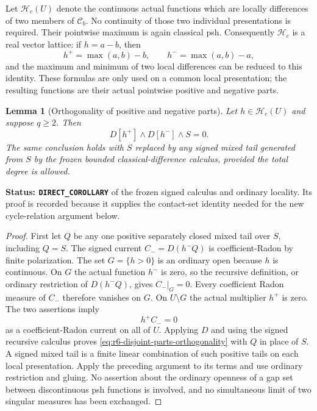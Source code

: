 \documentclass[11pt,a4paper]{article}
\numberwithin{equation}{section}
\newtheorem{lemma}[theorem]{Lemma}
\theoremstyle{definition}
\theoremstyle{remark}
\begin{document}
Let $\mathscr H_c(U)$ denote the continuous actual functions
which are locally differences of two members of
$\mathcal C_b$. No continuity of those two individual
presentations is required. Their pointwise maximum is again
classical psh. Consequently $\mathscr H_c$ is a real vector
lattice: if $h=a-b$, then
\[
 h^+=\max(a,b)-b,\qquad h^-=\max(a,b)-a,
\]
and the maximum and minimum of two local differences can
be reduced to this identity. These formulas are only used
on a common local presentation; the resulting functions
are their actual pointwise positive and negative parts.

\begin{lemma}[Orthogonality of positive and negative parts]
\label{lem:r6-disjoint-parts-orthogonality}
Let $h\in\mathscr H_c(U)$ and suppose $q\geq2$. Then
\begin{equation}
       D[h^+]\wedge D[h^-]\wedge S=0.
 \label{eq:r6-disjoint-parts-orthogonality}
\end{equation}
The same conclusion holds with $S$ replaced by any signed
mixed tail generated from $S$ by the frozen bounded
classical-difference calculus, provided the total degree
is allowed.
\end{lemma}

\noindent\textbf{Status: \texttt{DIRECT\_COROLLARY}} of the
frozen signed calculus and ordinary locality. Its proof is
recorded because it supplies the contact-set identity needed
for the new cycle-relation argument below.

\begin{proof}
First let $Q$ be any one positive separately closed mixed
tail over $S$, including $Q=S$. The signed current
$C_-=D(h^-Q)$ is coefficient-Radon by finite polarization.
The set $G=\{h>0\}$ is an ordinary open because $h$ is
continuous. On $G$ the actual function $h^-$ is zero, so
the recursive definition, or ordinary restriction of
$D(h^-Q)$, gives $C_-|_G=0$.
Every coefficient Radon measure of $C_-$ therefore vanishes
on $G$. On $U\setminus G$ the actual multiplier $h^+$ is
zero. The two assertions imply
\[
                              h^+ C_-=0
\]
as a coefficient-Radon current on all of $U$. Applying $D$
and using the signed recursive calculus proves
\eqref{eq:r6-disjoint-parts-orthogonality} with $Q$ in place
of $S$. A signed mixed tail is a finite linear combination
of such positive tails on each local presentation. Apply
the preceding argument to its terms and use ordinary
restriction and gluing. No assertion about the ordinary
openness of a gap set between discontinuous psh functions
is involved, and no simultaneous limit of two singular
measures has been exchanged.
\end{proof}
\end{document}
